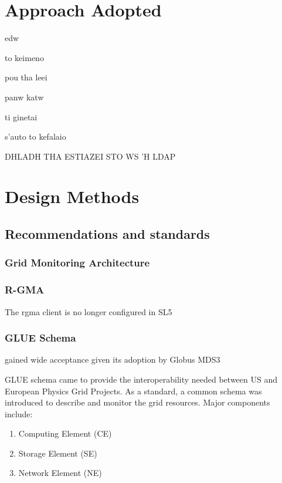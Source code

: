 \section{Approach Adopted}

edw

to keimeno

pou tha leei

panw katw

ti ginetai

s'auto to kefalaio

DHLADH THA ESTIAZEI STO WS 'H LDAP

\newpage


\section{Design Methods}
\subsection{Recommendations and standards}
\subsubsection{Grid Monitoring Architecture}
\newpage

\subsubsection{R-GMA}
The rgma client is no longer configured in SL5


\newpage
\subsubsection{GLUE Schema}
gained wide acceptance given its adoption by Globus MDS3


GLUE schema came to provide the interoperability needed between US and European Physics Grid Projects. As a standard, a common schema was introduced to describe and monitor the grid resources. Major components include:
\begin{enumerate}
\item Computing Element (CE)
\item Storage Element (SE)
\item Network Element (NE)
\end{enumerate}

